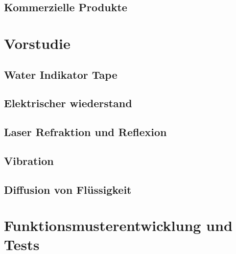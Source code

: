 \documentclass[a4paper,12pt]{article}
\begin{document}
\subsection{Kommerzielle Produkte}




\section{Vorstudie}


\subsection{Water Indikator Tape}


\newpage
\subsection{Elektrischer wiederstand}


\subsection{Laser Refraktion und Reflexion}


\subsection{Vibration}


\subsection{Diffusion von Flüssigkeit}
\label{sec:TinteVersuchsaufbau}


\section{Funktionsmusterentwicklung und Tests}

\end{document}
